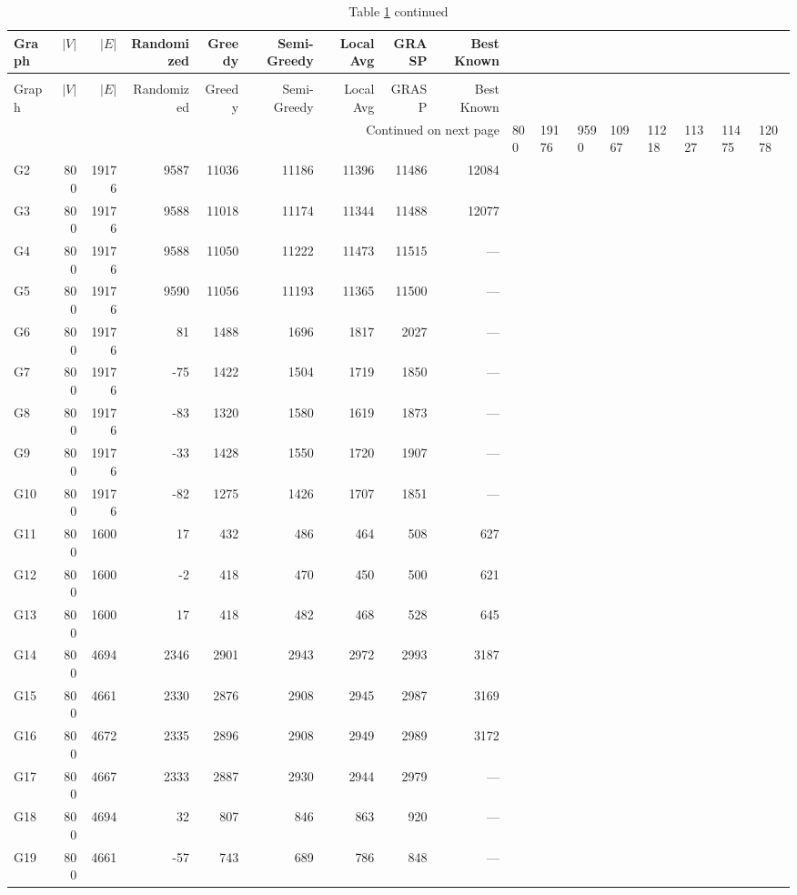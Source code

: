 \documentclass[12pt,a4paper]{article}
\begin{document}
\footnotesize
\begin{longtable}{lrrrrrrrr}
\caption{Complete benchmark results for all 54 graphs}
\label{tab:full}\\
\toprule
Graph & $|V|$ & $|E|$ & Randomized & Greedy & Semi-Greedy & Local Avg & GRASP & Best Known \\
\midrule
\endfirsthead
\caption*{Table \ref{tab:full} continued}\\
\toprule
Graph & $|V|$ & $|E|$ & Randomized & Greedy & Semi-Greedy & Local Avg & GRASP & Best Known \\
\midrule
\endhead
\midrule
\multicolumn{9}{r}{Continued on next page}
\endfoot
\bottomrule
\endlastfoot
G1 & 800 & 19176 & 9590 & 10967 & 11218 & 11327 & 11475 & 12078 \\
G2 & 800 & 19176 & 9587 & 11036 & 11186 & 11396 & 11486 & 12084 \\
G3 & 800 & 19176 & 9588 & 11018 & 11174 & 11344 & 11488 & 12077 \\
G4 & 800 & 19176 & 9588 & 11050 & 11222 & 11473 & 11515 & --- \\
G5 & 800 & 19176 & 9590 & 11056 & 11193 & 11365 & 11500 & --- \\
G6 & 800 & 19176 & 81 & 1488 & 1696 & 1817 & 2027 & --- \\
G7 & 800 & 19176 & -75 & 1422 & 1504 & 1719 & 1850 & --- \\
G8 & 800 & 19176 & -83 & 1320 & 1580 & 1619 & 1873 & --- \\
G9 & 800 & 19176 & -33 & 1428 & 1550 & 1720 & 1907 & --- \\
G10 & 800 & 19176 & -82 & 1275 & 1426 & 1707 & 1851 & --- \\
G11 & 800 & 1600 & 17 & 432 & 486 & 464 & 508 & 627 \\
G12 & 800 & 1600 & -2 & 418 & 470 & 450 & 500 & 621 \\
G13 & 800 & 1600 & 17 & 418 & 482 & 468 & 528 & 645 \\
G14 & 800 & 4694 & 2346 & 2901 & 2943 & 2972 & 2993 & 3187 \\
G15 & 800 & 4661 & 2330 & 2876 & 2908 & 2945 & 2987 & 3169 \\
G16 & 800 & 4672 & 2335 & 2896 & 2908 & 2949 & 2989 & 3172 \\
G17 & 800 & 4667 & 2333 & 2887 & 2930 & 2944 & 2979 & --- \\
G18 & 800 & 4694 & 32 & 807 & 846 & 863 & 920 & --- \\
G19 & 800 & 4661 & -57 & 743 & 689 & 786 & 848 & --- \\

\end{longtable}
\end{document}
